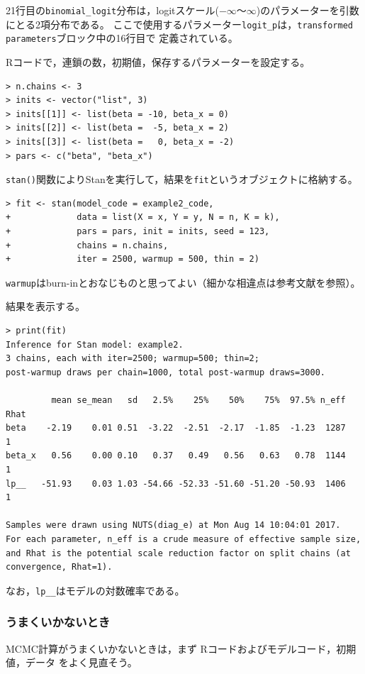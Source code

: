 \documentclass[11pt,uplatex]{jsarticle}
\begin{document}
21行目の\texttt{binomial\_logit}分布は，logitスケール($-\infty$〜$\infty$)のパラメーターを引数にとる2項分布である。
ここで使用するパラメーター\texttt{logit\_p}は，\texttt{transformed parameters}ブロック中の16行目で
定義されている。

\textsf{R}コードで，連鎖の数，初期値，保存するパラメーターを設定する。
\begin{lstlisting}
> n.chains <- 3
> inits <- vector("list", 3)
> inits[[1]] <- list(beta = -10, beta_x = 0)
> inits[[2]] <- list(beta =  -5, beta_x = 2)
> inits[[3]] <- list(beta =   0, beta_x = -2)
> pars <- c("beta", "beta_x")
\end{lstlisting}

\texttt{stan()}関数によりStanを実行して，結果を\texttt{fit}というオブジェクトに格納する。
\begin{lstlisting}
> fit <- stan(model_code = example2_code,
+             data = list(X = x, Y = y, N = n, K = k),
+             pars = pars, init = inits, seed = 123,
+             chains = n.chains,
+             iter = 2500, warmup = 500, thin = 2)
\end{lstlisting}
\noindent
\texttt{warmup}はburn-inとおなじものと思ってよい（細かな相違点は参考文献\cite{BDA3}を参照）。

結果を表示する。
\begin{lstlisting}[basicstyle=\ttfamily\footnotesize]
> print(fit)
Inference for Stan model: example2.
3 chains, each with iter=2500; warmup=500; thin=2; 
post-warmup draws per chain=1000, total post-warmup draws=3000.

         mean se_mean   sd   2.5%    25%    50%    75%  97.5% n_eff Rhat
beta    -2.19    0.01 0.51  -3.22  -2.51  -2.17  -1.85  -1.23  1287    1
beta_x   0.56    0.00 0.10   0.37   0.49   0.56   0.63   0.78  1144    1
lp__   -51.93    0.03 1.03 -54.66 -52.33 -51.60 -51.20 -50.93  1406    1

Samples were drawn using NUTS(diag_e) at Mon Aug 14 10:04:01 2017.
For each parameter, n_eff is a crude measure of effective sample size,
and Rhat is the potential scale reduction factor on split chains (at 
convergence, Rhat=1).
\end{lstlisting}
\noindent
なお，\texttt{lp\_\_}はモデルの対数確率である。

\subsubsection{うまくいかないとき}
MCMC計算がうまくいかないときは，まず \textsf{R}コードおよびモデルコード，初期値，データ
をよく見直そう。
\end{document}
